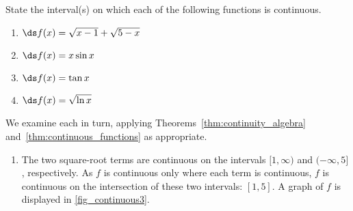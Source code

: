 \begin{example}\label{ex_cont_funct}%
State the interval(s) on which each of the following functions is continuous.
\begin{multicols}{2}
	\begin{enumerate}
		\item	$\ds f(x) = \sqrt{x-1} + \sqrt{5-x}$
		\item	$\ds f(x) = x\sin x$
		\item	$\ds f(x) = \tan x$
		\item	$\ds f(x) = \sqrt{\ln x}$
	\end{enumerate}
\end{multicols}
\solution
We examine each in turn, applying Theorems~\ref{thm:continuity_algebra} and~\ref{thm:continuous_functions} as appropriate.


\begin{enumerate}
	\item	The two square-root terms are continuous on the intervals $[1,\infty)$ and $(-\infty,5]$, respectively. As $f$ is continuous only where each term is continuous, $f$ is continuous on the intersection of these two intervals: $[1,5]$. A graph of $f$ is displayed in \autoref{fig_continuous3}.


\end{enumerate}
\end{example}
